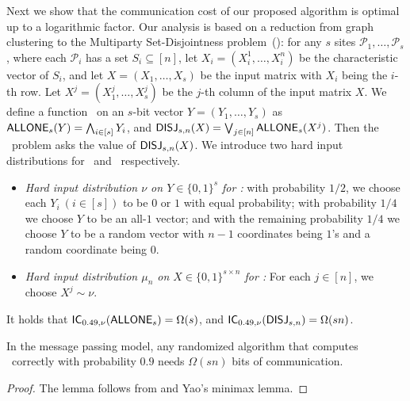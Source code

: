 Next we show that the communication cost of our proposed algorithm is optimal up to a logarithmic factor. 
 Our analysis is based on a reduction from graph clustering to the Multiparty Set-Disjointness problem~(\DISJN): for any $s$ sites  $\mathcal{P}_1,\ldots, \mathcal{P}_s$, where each  $\mathcal{P}_i$ has a set $S_i\subseteq [n]$, let $X_i = (X_i^1, \ldots, X_i^n)$ be the characteristic vector of $S_i$, and let $X = (X_1, \ldots, X_s)$ be the input matrix with $X_i$ being the $i$-th row.  Let $X^j = (X_1^j, \ldots, X_s^j)$ be the $j$-th column of the input matrix $X$. 
We define a function \ONE\ on an $s$-bit vector $Y = (Y_1, \ldots, Y_s)$ as
$
\text{{$\mathsf{ALLONE}_s$}} (Y)  =  \bigwedge_{i \in [s]} Y_i$, and $ \text{{$\mathsf{DISJ}_{s,n}$}}(X) = \bigvee_{j \in [n]} \text{{$\mathsf{ALLONE}_s$}} (X^j)$. Then the \DISJN\ problem asks the value of $\text{{$\mathsf{DISJ}_{s,n}$}}(X)$.
We  introduce two hard input distributions for \ONE\ and \DISJN\ respectively.  
\begin{itemize}
\item {\em Hard input distribution $\nu$ on $Y \in \{0,1\}^s$ for \ONE:} with probability $1/2$, we choose each $Y_i\ (i \in [s])$ to be $0$ or $1$ with equal probability; with probability $1/4$ we choose $Y$ to be an all-$1$ vector; and with the remaining probability $1/4$ we choose $Y$ to be a random vector with $n-1$ coordinates being $1$'s and a random coordinate being $0$.
\item {\em Hard input distribution $\mu_n$ on $X \in \{0,1\}^{s \times n}$ for \DISJN:}  For each $j \in [n]$, we choose $X^j \sim \nu$.  
\end{itemize}



\begin{thm} \label{thm:DISJ} 
It holds that $\mathsf{IC}_{0.49, \nu}(\text{{$\mathsf{ALLONE}_s$}}) = \Omega(s)$, and 
  $\mathsf{IC}_{0.49, \nu}(\text{{$\mathsf{DISJ}_{s,n}$}}) = \Omega(sn)$.
\end{thm}



\begin{lem} \label{lem:DISJ}
In the message passing model, any randomized algorithm that computes \DISJN\ correctly with probability $0.9$ needs $\Omega(sn)$ bits of communication.
\end{lem}


\begin{proof}
The lemma follows from  and Yao's minimax lemma.
\end{proof}

